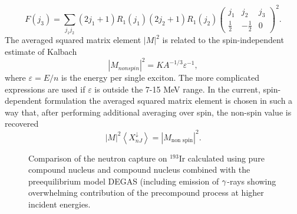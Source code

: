\begin{equation}
F(j_{3})=\sum_{j_{1}j_{2}}(2j_{1}+1)R_{1}(j_{1})(2j_{2}+1)R_{1}(j_{2})\left(
\begin{array}{ccc}
j_{1} & j_{2} & j_{3} \\
\frac{1}{2} & -\frac{1}{2} & 0%
\end{array}%
\right) ^{2}.
\end{equation}%
The averaged squared matrix element $|M|^{2}$ is related to the
spin-independent estimate of Kalbach \cite{Kalbach}
\begin{equation}
|M_{nonspin}|^{2}=KA^{-1/3}\varepsilon ^{-1},
\end{equation}%
\noindent where $\varepsilon =E/n$ is the energy per single exciton. The
more complicated expressions \cite{Kalbach} are used if $\varepsilon $ is
outside the 7-15 MeV range. In the current, spin-dependent formulation the
averaged squared matrix element is chosen in such a way that, after
performing additional averaging over spin, the non-spin value is recovered
\begin{equation}
|M|^{2}\left\langle X_{nJ}^{\downarrow }\right\rangle =|M_{\text{non spin}%
}|^{2}.
\end{equation}%
\begin{figure}[tbph]
\caption{Comparison of the neutron capture on $^{193}$Ir calculated using
pure compound nucleus and compound nucleus combined with the preequilibrium
model DEGAS (including emission of $\protect\gamma $-rays showing
overwhelming contribution of the precompound process at higher incident
energies. }
\label{ir193}
\end{figure}

